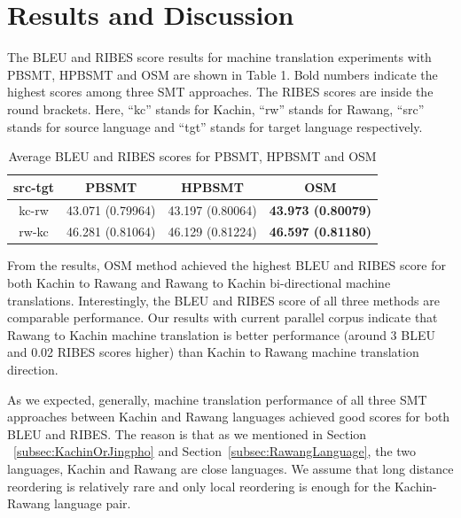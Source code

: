 \documentclass[conference]{IEEEtran}
\begin{document}
\section{Results and Discussion}
\label{sec:R&D}

The BLEU and RIBES score results for machine translation experiments with PBSMT, HPBSMT and OSM are shown in Table 1. Bold numbers indicate the highest scores among three SMT approaches. The RIBES scores are inside the round brackets. Here, “kc” stands for Kachin, “rw” stands for Rawang, “src” stands for source language and “tgt” stands for target language respectively.


\begin{table}[h!]
\caption{\label{table:result} Average BLEU and RIBES scores for PBSMT, HPBSMT and OSM}
\begin{center}
\begin{tabular}{ |c|c|c|c| } 
 \hline
 \bf src-tgt & \bf PBSMT & \bf HPBSMT & \bf OSM \\[5pt]
 \hline
 kc-rw & 43.071 (0.79964) & 43.197 (0.80064) & \bf 43.973 \bf (0.80079)\\[5pt] 
 \hline
 rw-kc & 46.281 (0.81064) & 46.129 (0.81224) & \bf 46.597 \bf (0.81180)\\[5pt]
 \hline
\end{tabular}
\end{center}
\end{table}


From the results, OSM method achieved the highest BLEU and RIBES score for both Kachin to Rawang and Rawang to Kachin bi-directional machine translations. Interestingly, the BLEU and RIBES score of all three methods are comparable performance. Our results with current parallel corpus indicate that Rawang to Kachin machine translation is better performance (around 3 BLEU and 0.02 RIBES scores higher) than Kachin to Rawang machine translation direction. 

As we expected, generally, machine translation performance of all three SMT approaches between Kachin and Rawang languages achieved good scores for both BLEU and RIBES. The reason is that as we mentioned in Section ~\ref{subsec:KachinOrJingpho} and  Section~\ref{subsec:RawangLanguage}, the two languages, Kachin and Rawang are close languages.  We assume that long distance reordering is relatively rare and only local reordering is enough for the Kachin-Rawang language pair.
\end{document}
